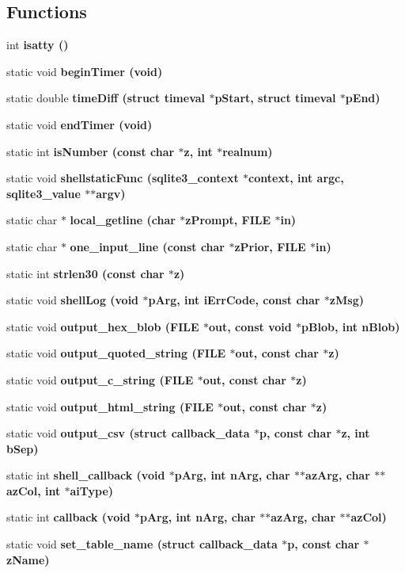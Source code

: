 \subsection*{Functions}
\begin{CompactItemize}
\item 
int \bf{isatty} ()
\item 
static void \bf{begin\-Timer} (void)
\item 
static double \bf{time\-Diff} (struct timeval $\ast$p\-Start, struct timeval $\ast$p\-End)
\item 
static void \bf{end\-Timer} (void)
\item 
static int \bf{is\-Number} (const char $\ast$z, int $\ast$realnum)
\item 
static void \bf{shellstatic\-Func} (\bf{sqlite3\_\-context} $\ast$context, int argc, \bf{sqlite3\_\-value} $\ast$$\ast$argv)
\item 
static char $\ast$ \bf{local\_\-getline} (char $\ast$z\-Prompt, FILE $\ast$in)
\item 
static char $\ast$ \bf{one\_\-input\_\-line} (const char $\ast$z\-Prior, FILE $\ast$in)
\item 
static int \bf{strlen30} (const char $\ast$z)
\item 
static void \bf{shell\-Log} (void $\ast$p\-Arg, int i\-Err\-Code, const char $\ast$z\-Msg)
\item 
static void \bf{output\_\-hex\_\-blob} (FILE $\ast$out, const void $\ast$p\-Blob, int n\-Blob)
\item 
static void \bf{output\_\-quoted\_\-string} (FILE $\ast$out, const char $\ast$z)
\item 
static void \bf{output\_\-c\_\-string} (FILE $\ast$out, const char $\ast$z)
\item 
static void \bf{output\_\-html\_\-string} (FILE $\ast$out, const char $\ast$z)
\item 
static void \bf{output\_\-csv} (struct \bf{callback\_\-data} $\ast$p, const char $\ast$z, int b\-Sep)
\item 
static int \bf{shell\_\-callback} (void $\ast$p\-Arg, int n\-Arg, char $\ast$$\ast$az\-Arg, char $\ast$$\ast$az\-Col, int $\ast$ai\-Type)
\item 
static int \bf{callback} (void $\ast$p\-Arg, int n\-Arg, char $\ast$$\ast$az\-Arg, char $\ast$$\ast$az\-Col)
\item 
static void \bf{set\_\-table\_\-name} (struct \bf{callback\_\-data} $\ast$p, const char $\ast$z\-Name)
\item 
$$
\end{CompactItemize}
